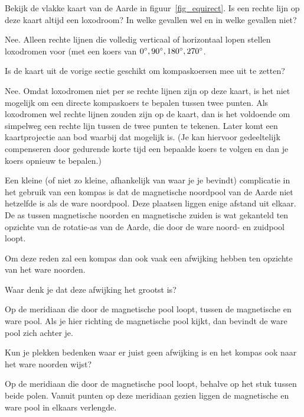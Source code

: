 \begin{opgave}[\ster]
	\begin{subopgave}
		Bekijk de vlakke kaart van de Aarde in figuur~\ref{fig_equirect}. Is een rechte lijn op deze kaart altijd een loxodroom? In welke gevallen wel en in welke gevallen niet?
		\begin{antwoord}
			Nee. Alleen rechte lijnen die volledig verticaal of horizontaal lopen stellen loxodromen voor (met een koers van $0\degree, 90\degree, 180\degree, 270\degree$. 
		\end{antwoord}
	\end{subopgave}
	\begin{subopgave}
		Is de kaart uit de vorige sectie geschikt om kompaskoersen mee uit te zetten?
		\begin{antwoord}
			Nee. Omdat loxodromen niet per se rechte lijnen zijn op deze kaart, is het niet mogelijk om een directe kompaskoers te bepalen tussen twee punten. Als loxodromen wel rechte lijnen zouden zijn op de kaart, dan is het voldoende om simpelweg een rechte lijn tussen de twee punten te tekenen. Later komt een kaartprojectie aan bod waarbij dat mogelijk is. (Je kan hiervoor gedeeltelijk compenseren door gedurende korte tijd een bepaalde koers te volgen en dan je koers opnieuw te bepalen.)
		\end{antwoord}
	\end{subopgave}
\end{opgave}
	
Een kleine (of niet zo kleine, afhankelijk van waar je je bevindt) complicatie in het gebruik van een kompas is dat de magnetische noordpool van de Aarde niet hetzelfde is als de ware noordpool. Deze plaatsen liggen enige afstand uit elkaar. De as tussen magnetische noorden en magnetische zuiden is wat gekanteld ten opzichte van de rotatie-as van de Aarde, die door de ware noord- en zuidpool loopt.

Om deze reden zal een kompas dan ook vaak een afwijking hebben ten opzichte van het ware noorden.

\begin{opgave}
	\begin{subopgave}
		Waar denk je dat deze afwijking het grootst is?
		\begin{antwoord}
			Op de meridiaan die door de magnetische pool loopt, tussen de magnetische en ware pool. Als je hier richting de magnetische pool kijkt, dan bevindt de ware pool zich achter je.
		\end{antwoord}
	\end{subopgave}
	\begin{subopgave}
		Kun je plekken bedenken waar er juist geen afwijking is en het kompas ook naar het ware noorden wijst?
		\begin{antwoord}
			Op de meridiaan die door de magnetische pool loopt, behalve op het stuk tussen beide polen. Vanuit punten op deze meridiaan gezien liggen de magnetische en ware pool in elkaars verlengde.
		\end{antwoord}
	\end{subopgave}	
\end{opgave}

